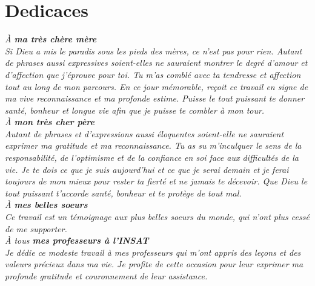 \chapter*{Dedicaces}
\begin{spacing}{1.5}
{\selectfont
\noindent
\itshape{
\Large{À \textbf{ma très chère mère}}
}\\
\noindent
\textit{
\large{Si Dieu a mis le paradis sous les pieds des mères, ce n’est pas pour rien. Autant de phrases aussi expressives soient-elles ne sauraient montrer le degré d’amour et d’affection que j’éprouve pour toi. Tu m’as comblé avec ta tendresse et affection tout au long de mon parcours. En ce jour mémorable, reçoit ce travail en signe de ma vive reconnaissance et ma profonde estime. Puisse le tout puissant te donner santé, bonheur et longue vie afin que je puisse te combler à mon tour.}}\\

\noindent
\itshape{
\Large{À \textbf{mon très cher père}}
}\\
\noindent
\textit{
\large{Autant de phrases et d’expressions aussi éloquentes soient-elle ne sauraient exprimer ma gratitude et ma reconnaissance. Tu as su m’inculquer le sens de la responsabilité, de l’optimisme et de la confiance en soi face aux difficultés de la vie. Je te dois ce que je suis aujourd’hui et ce que je serai demain et je ferai toujours de mon mieux pour rester ta fierté et ne jamais te décevoir. Que Dieu le tout puissant t’accorde santé, bonheur et te protège de tout mal.}}\\

\noindent
\itshape{
\Large{À \textbf{mes belles soeurs}}
}\\
\noindent
\textit{
\large{Ce travail est un témoignage aux plus belles soeurs du monde, qui n'ont plus cessé de me supporter.}}\\

\noindent
\itshape{
\Large{À tous \textbf{mes professeurs à l’INSAT}}
}\\
\noindent
\textit{
\large{Je dédie ce modeste travail à mes professeurs qui m'ont appris des leçons et des valeurs précieux dans ma vie. Je profite de cette occasion pour leur exprimer ma profonde gratitude et couronnement de leur assistance.}}

}
\end{spacing}